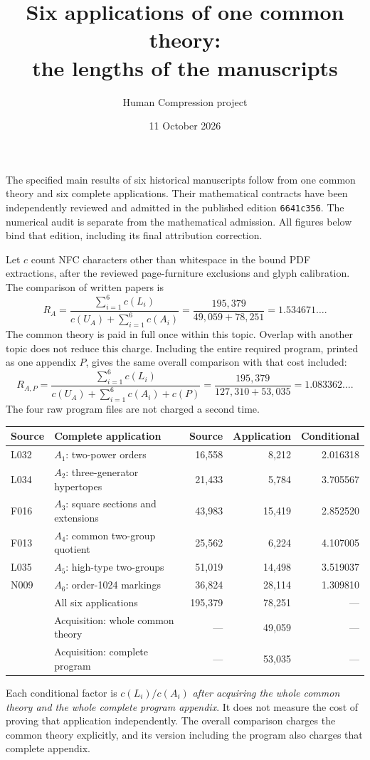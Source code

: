 \documentclass[11pt,a4paper]{article}
\title{Six applications of one common theory:\\the lengths of the manuscripts}
\author{Human Compression project}
\date{11 October 2026}
\begin{document}
\maketitle
\noindent The specified main results of six historical manuscripts follow
from one common theory and six complete applications. Their mathematical
contracts have been independently reviewed and admitted in the published
edition \texttt{6641c356}. The numerical audit is separate from the
mathematical admission. All figures below bind that edition, including its final attribution
correction.

Let $c$ count NFC characters other than whitespace in the bound PDF
extractions, after the reviewed page-furniture exclusions and glyph
calibration. The comparison of written papers is
\[
 R_A=\frac{\sum_{i=1}^{6}c(L_i)}{c(U_A)+\sum_{i=1}^{6}c(A_i)}
 =\frac{195{,}379}{49{,}059+78{,}251}=1.534671\ldots.
\]
The common theory is paid in full once within this topic. Overlap with another
topic does not reduce this charge. Including the entire required program,
printed as one appendix $P$, gives the same overall comparison with that cost included:
\[
 R_{A,P}=\frac{\sum_{i=1}^{6}c(L_i)}{c(U_A)+\sum_{i=1}^{6}c(A_i)+c(P)}
 =\frac{195{,}379}{127{,}310+53{,}035}=1.083362\ldots.
\]
The four raw program files are not charged a second time.

\begin{center}\small
\begin{tabular}{llrrr}\toprule
Source & Complete application & Source & Application & Conditional\\\midrule
L032 & $A_1$: two-power orders & 16,558 & 8,212 & 2.016318\\
L034 & $A_2$: three-generator hypertopes & 21,433 & 5,784 & 3.705567\\
F016 & $A_3$: square sections and extensions & 43,983 & 15,419 & 2.852520\\
F013 & $A_4$: common two-group quotient & 25,562 & 6,224 & 4.107005\\
L035 & $A_5$: high-type two-groups & 51,019 & 14,498 & 3.519037\\
N009 & $A_6$: order-1024 markings & 36,824 & 28,114 & 1.309810\\\midrule
 & All six applications & 195,379 & 78,251 & ---\\
 & Acquisition: whole common theory & --- & 49,059 & ---\\
 & Acquisition: complete program & --- & 53,035 & ---\\\bottomrule
\end{tabular}\end{center}
Each conditional factor is $c(L_i)/c(A_i)$ \emph{after acquiring the whole
common theory and the whole complete program appendix}. It does not measure
the cost of proving that application independently. The overall comparison
charges the common theory explicitly, and its version including the program
also charges that complete appendix.
\end{document}
